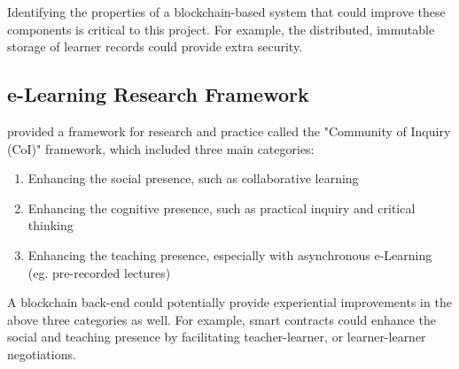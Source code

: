 Identifying the properties of a blockchain-based system that could improve these components is 
critical to this project. For example, the distributed, immutable storage of learner records could 
provide extra security.

\subsection{e-Learning Research Framework}

\citet{garrison2011learning} provided a framework for research and practice called the "Community 
of Inquiry (CoI)" framework, which included three main categories:

\begin{enumerate}
    \item Enhancing the social presence, such as collaborative learning
    \item Enhancing the cognitive presence, such as practical inquiry and critical thinking
    \item Enhancing the teaching presence, especially with asynchronous e-Learning (eg. pre-recorded lectures)
\end{enumerate}

A blockchain back-end could potentially provide experiential improvements in the above three categories as well. 
For example, smart contracts could enhance the social and teaching presence by facilitating teacher-learner, or 
learner-learner negotiations.



